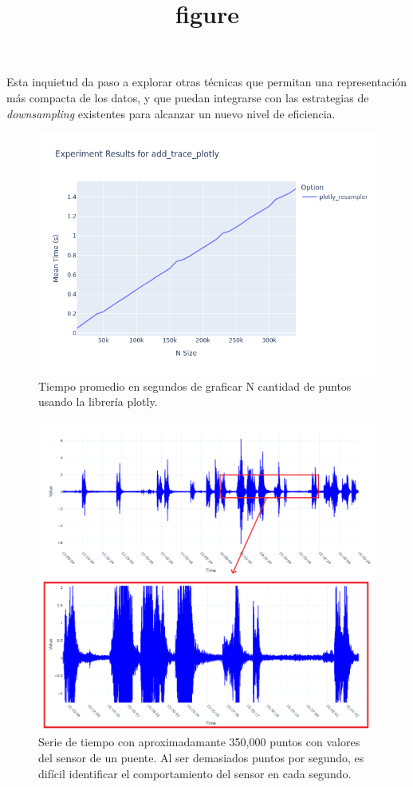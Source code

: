 Esta inquietud da paso a explorar otras técnicas que permitan una representación más compacta de los datos, y que puedan integrarse con las estrategias de \textit{downsampling} existentes para alcanzar un nuevo nivel de eficiencia.


\begin{figure}
    \centering
    \includegraphics[width=0.9\linewidth]{introduction/images/add_trace_plotly.png}
    \title{figure}
    \caption{Tiempo promedio en segundos de graficar N cantidad de puntos usando la librería plotly.}
    \label{add_trace_plotly}
\end{figure}

\begin{figure}
    \centering
    \includegraphics[width=0.9\linewidth]{introduction/images/squashed_plot.png}
    \caption{Serie de tiempo con aproximadamante 350,000 puntos con valores del sensor de un puente. Al ser demasiados puntos por segundo, es difícil identificar el comportamiento del sensor en cada segundo.}
    \label{squashed_plot}
\end{figure}

